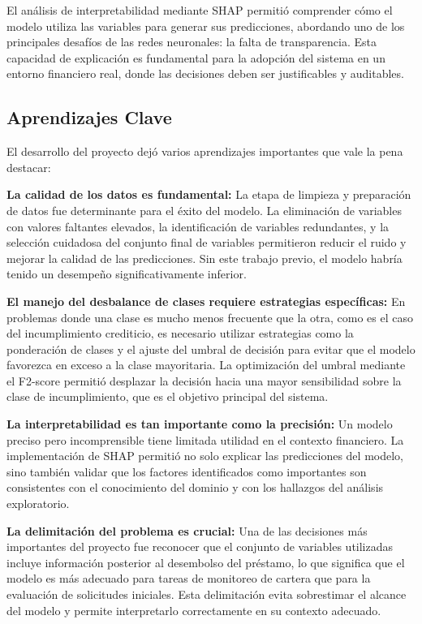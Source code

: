 \documentclass[12pt,a4paper]{article}
\begin{document}
El análisis de interpretabilidad mediante SHAP permitió comprender cómo el modelo utiliza las variables para generar sus predicciones, abordando uno de los principales desafíos de las redes neuronales: la falta de transparencia. Esta capacidad de explicación es fundamental para la adopción del sistema en un entorno financiero real, donde las decisiones deben ser justificables y auditables.

\subsection{Aprendizajes Clave}

El desarrollo del proyecto dejó varios aprendizajes importantes que vale la pena destacar:

\textbf{La calidad de los datos es fundamental:} La etapa de limpieza y preparación de datos fue determinante para el éxito del modelo. La eliminación de variables con valores faltantes elevados, la identificación de variables redundantes, y la selección cuidadosa del conjunto final de variables permitieron reducir el ruido y mejorar la calidad de las predicciones. Sin este trabajo previo, el modelo habría tenido un desempeño significativamente inferior.

\textbf{El manejo del desbalance de clases requiere estrategias específicas:} En problemas donde una clase es mucho menos frecuente que la otra, como es el caso del incumplimiento crediticio, es necesario utilizar estrategias como la ponderación de clases y el ajuste del umbral de decisión para evitar que el modelo favorezca en exceso a la clase mayoritaria. La optimización del umbral mediante el F2-score permitió desplazar la decisión hacia una mayor sensibilidad sobre la clase de incumplimiento, que es el objetivo principal del sistema.

\textbf{La interpretabilidad es tan importante como la precisión:} Un modelo preciso pero incomprensible tiene limitada utilidad en el contexto financiero. La implementación de SHAP permitió no solo explicar las predicciones del modelo, sino también validar que los factores identificados como importantes son consistentes con el conocimiento del dominio y con los hallazgos del análisis exploratorio.

\textbf{La delimitación del problema es crucial:} Una de las decisiones más importantes del proyecto fue reconocer que el conjunto de variables utilizadas incluye información posterior al desembolso del préstamo, lo que significa que el modelo es más adecuado para tareas de monitoreo de cartera que para la evaluación de solicitudes iniciales. Esta delimitación evita sobrestimar el alcance del modelo y permite interpretarlo correctamente en su contexto adecuado.
\end{document}
